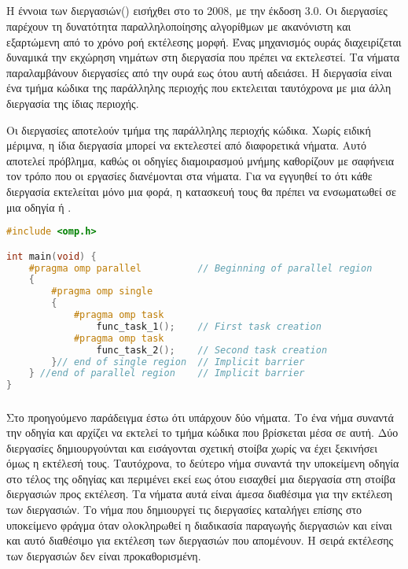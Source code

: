 \subsection{}
\subparagraph{}
Η έννοια των διεργασιών(\emph{}) εισήχθει στο \emph{} το 2008, με την έκδοση
3.0\cite{parallel_dist}. Οι διεργασίες παρέχουν τη δυνατότητα παραλληλοποίησης αλγορίθμων με ακανόνιστη και εξαρτώμενη
από το χρόνο ροή εκτέλεσης μορφή. Ένας μηχανισμός ουράς διαχειρίζεται δυναμικά την εκχώρηση νημάτων στη διεργασία που
πρέπει να εκτελεστεί. Τα νήματα παραλαμβάνουν διεργασίες από την ουρά εως ότου αυτή αδειάσει. Η διεργασία είναι ένα
τμήμα κώδικα της παράλληλης περιοχής που εκτελειται ταυτόχρονα με μια άλλη διεργασία της ίδιας περιοχής. 

Οι διεργασίες αποτελούν τμήμα της παράλληλης περιοχής κώδικα. Χωρίς ειδική μέριμνα, η ίδια διεργασία μπορεί να
εκτελεστεί από διαφορετικά νήματα. Αυτό αποτελεί πρόβλημα, καθώς οι οδηγίες διαμοιρασμού μνήμης καθορίζουν με σαφήνεια
τον τρόπο που οι εργασίες διανέμονται στα νήματα. Για να εγγυηθεί το \emph{} ότι κάθε διεργασία εκτελείται
μόνο μια φορά, η κατασκευή τους θα πρέπει να ενσωματωθεί σε μια οδηγία \emph{} ή \emph{}.

		\begin{lstlisting}[tabsize=4, basicstyle=\small, language=C++, caption={\el{Παράδειγμα κώδικα με διεργασίες}}, frame=tb]
#include <omp.h>

int main(void) {	
	#pragma omp parallel          // Beginning of parallel region
	{
		#pragma omp single
		{
			#pragma omp task
				func_task_1();    // First task creation
			#pragma omp task
				func_task_2();    // Second task creation
		}// end of single region  // Implicit barrier
	} //end of parallel region    // Implicit barrier
}
\end{lstlisting}

\subparagraph{}
Στο προηγούμενο παράδειγμα έστω ότι υπάρχουν δύο νήματα. Το ένα νήμα συναντά την οδηγία \emph{} και αρχίζει
να εκτελεί το τμήμα κώδικα που βρίσκεται μέσα σε αυτή. Δύο διεργασίες δημιουργούνται και εισάγονται σχετική στοίβα χωρίς
να έχει ξεκινήσει όμως η εκτέλεσή τους. Ταυτόχρονα, το δεύτερο νήμα συναντά την υποκείμενη οδηγία \emph{}
στο τέλος της οδηγίας \emph{} και περιμένει εκεί εως ότου εισαχθεί μια διεργασία στη στοίβα διεργασιών προς
εκτέλεση. Τα νήματα αυτά είναι άμεσα διαθέσιμα για την εκτέλεση των διεργασιών. Το νήμα που δημιουργεί τις διεργασίες
καταλήγει επίσης στο υποκείμενο φράγμα όταν ολοκληρωθεί η διαδικασία παραγωγής διεργασιών και είναι και αυτό διαθέσιμο
για εκτέλεση των διεργασιών που απομένουν. Η σειρά εκτέλεσης των διεργασιών δεν είναι προκαθορισμένη.
